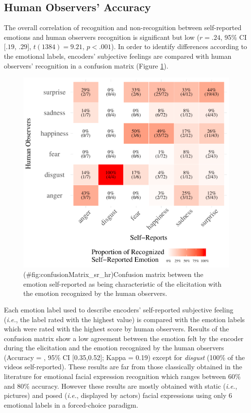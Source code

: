 \documentclass[man]{apa6}
\begin{document}
\hypertarget{human-observers-accuracy}{%
\subsection{Human Observers' Accuracy}\label{human-observers-accuracy}}

The overall correlation of recognition and non-recognition between self-reported emotions and human observers recognition is significant but low (\(r = .24\), 95\% CI \([.19\), \(.29]\), \(t(1384) = 9.21\), \(p < .001\)). In order to identify differences according to the emotional labels, encoders' subjective feelings are compared with human observers' recognition in a confusion matrix (Figure \ref{fig:confusionMatrix_sr_hr}).

\begin{figure}
\centering
\includegraphics{manuscript_apa_files/figure-latex/confusionMatrix_sr_hr-1.pdf}
\caption{(\#fig:confusionMatrix\_sr\_hr)\label{fig:confusionMatrix_sr_hr}Confusion matrix between the emotion self-reported as being characteristic of the elicitation with the emotion recognized by the human observers.}
\end{figure}

Each emotion label used to describe encoders' self-reported subjective feeling (\emph{i.e.}, the label rated with the highest value) is compared with the emotion labels which were rated with the highest score by human observers. Results of the confusion matrix show a low agreement between the emotion felt by the encoder during the elicitation and the emotion recognized by the human observers (Accuracy \nolinebreak = , 95\% CI {[}0.35,0.52{]}; Kappa = 0.19) except for \emph{disgust} (100\% of the videos self-reported). These results are far from those classically obtained in the literature for emotional facial expression recognition which ranges between 60\% and 80\% accuracy. However these results are mostly obtained with static (\emph{i.e.}, pictures) and posed (\emph{i.e.}, displayed by actors) facial expressions using only 6 emotional labels in a forced-choice paradigm.
\end{document}
